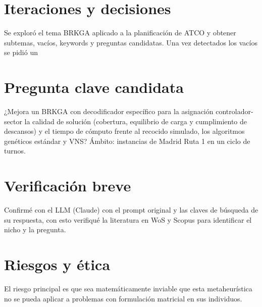 \section{Iteraciones y decisiones}
Se exploró el tema BRKGA aplicado a la planificación de ATCO y obtener subtemas, vacíos, keywords y preguntas candidatas. Una vez detectados los vacíos se pidió un
\section{Pregunta clave candidata}
¿Mejora un BRKGA con decodificador específico para la asignación controlador-sector la calidad de solución (cobertura, equilibrio de carga y cumplimiento de descansos) y el tiempo de cómputo frente al recocido simulado, los algoritmos genéticos estándar y VNS?
Ámbito: instancias de Madrid Ruta 1 en un ciclo de turnos.
\section{Verificación breve}
Confirmé con el LLM (Claude) con el prompt original y las claves de búsqueda de su respuesta, con esto verifiqué la literatura en WoS y Scopus para identificar el nicho y la pregunta.
\section{Riesgos y ética}
El riesgo principal es que sea matemáticamente inviable que esta metaheurística no se pueda aplicar a problemas con formulación matricial en sus individuos.


